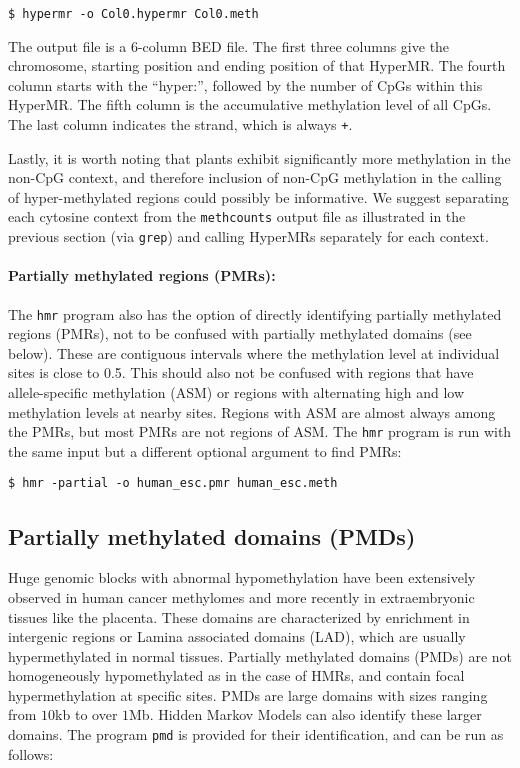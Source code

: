 \documentclass[10pt]{article}
\newcommand{\prog}[1]{\texttt{#1}}
\newcommand{\lit}[1]{\texttt{#1}}
\begin{document}
\begin{verbatim}
$ hypermr -o Col0.hypermr Col0.meth
\end{verbatim}

The output file is a 6-column BED file. The first three columns give
the chromosome, starting position and ending position of that
HyperMR. The fourth column starts with the ``hyper:'', followed by the
number of CpGs within this HyperMR. The fifth column is the
accumulative methylation level of all CpGs. The last column indicates
the strand, which is always \lit{+}.

Lastly, it is worth noting that plants exhibit significantly more
methylation in the non-CpG context, and therefore inclusion of non-CpG
methylation in the calling of hyper-methylated regions could possibly
be informative. We suggest separating each cytosine context from the
\prog{methcounts} output file as illustrated in the previous section
(via \prog{grep}) and calling HyperMRs separately for each context.

\paragraph{Partially methylated regions (PMRs):}
The \prog{hmr} program also has the option of directly identifying
partially methylated regions (PMRs), not to be confused with partially
methylated domains (see below). These are contiguous intervals where
the methylation level at individual sites is close to 0.5. This should
also not be confused with regions that have allele-specific
methylation (ASM) or regions with alternating high and low methylation
levels at nearby sites. Regions with ASM are almost always among the
PMRs, but most PMRs are not regions of ASM. The \prog{hmr} program is
run with the same input but a different optional argument to find
PMRs:
\begin{verbatim}
$ hmr -partial -o human_esc.pmr human_esc.meth
\end{verbatim}


\subsection{Partially methylated domains (PMDs)}

Huge genomic blocks with abnormal hypomethylation have been
extensively observed in human cancer methylomes and more recently in
extraembryonic tissues like the placenta. These domains are
characterized by enrichment in intergenic regions or Lamina associated
domains (LAD), which are usually hypermethylated in normal
tissues. Partially methylated domains (PMDs) are not homogeneously
hypomethylated as in the case of HMRs, and contain focal
hypermethylation at specific sites. PMDs are large domains with sizes
ranging from $10$kb to over $1$Mb. Hidden Markov Models can also
identify these larger domains. The program \prog{pmd}
\cite{decato2020characterization} is provided for
their identification, and can be run as follows:
\end{document}
